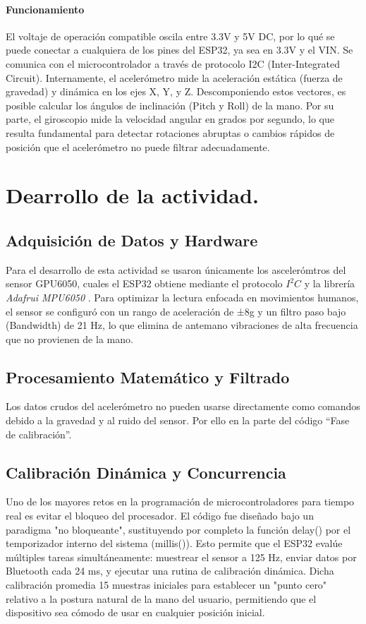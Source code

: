 \documentclass[conference]{IEEEtran}
\begin{document}
  \paragraph{Funcionamiento} El voltaje de operación compatible oscila entre 3.3V y 5V DC, por lo qué se puede conectar a cualquiera de los pines del ESP32, ya sea en 3.3V y el VIN. Se comunica con el microcontrolador a través de protocolo I2C (Inter-Integrated Circuit). 
  Internamente, el acelerómetro mide la aceleración estática (fuerza de gravedad) y dinámica en los ejes X, Y, y Z. Descomponiendo estos vectores, es posible calcular los ángulos de inclinación (Pitch y Roll) de la mano. Por su parte, el giroscopio mide la velocidad angular en grados por segundo, lo que resulta fundamental para detectar rotaciones abruptas o cambios rápidos de posición que el acelerómetro no puede filtrar adecuadamente.

\section{Dearrollo de la actividad.}
  \subsection{Adquisición de Datos y Hardware}
  Para el desarrollo de esta actividad se usaron únicamente los ascelerómtros del sensor GPU6050, cuales el ESP32 obtiene mediante el protocolo $I^2C$ y la librería \textit{Adafrui MPU6050} \cite{adafruit2021mpu6050}. Para optimizar la lectura enfocada en movimientos humanos, el sensor se configuró con un rango de aceleración de ±8g y un filtro paso bajo (Bandwidth) de 21 Hz, lo que elimina de antemano vibraciones de alta frecuencia que no provienen de la mano.

  \subsection{Procesamiento Matemático y Filtrado}
  Los datos crudos del acelerómetro no pueden usarse directamente como comandos debido a la gravedad y al ruido del sensor. Por ello en la parte del código ``Fase de calibración''.

  \subsection{Calibración Dinámica y Concurrencia}
  Uno de los mayores retos en la programación de microcontroladores para tiempo real es evitar el bloqueo del procesador. El código fue diseñado bajo un paradigma "no bloqueante", sustituyendo por completo la función delay() por el temporizador interno del sistema (millis()). Esto permite que el ESP32 evalúe múltiples tareas simultáneamente: muestrear el sensor a 125 Hz, enviar datos por Bluetooth cada 24 ms, y ejecutar una rutina de calibración dinámica. Dicha calibración promedia 15 muestras iniciales para establecer un "punto cero" relativo a la postura natural de la mano del usuario, permitiendo que el dispositivo sea cómodo de usar en cualquier posición inicial.
  
\end{document}
